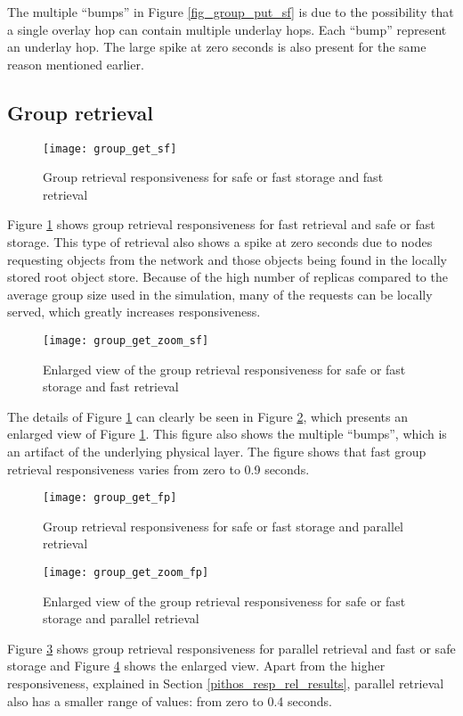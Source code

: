 The multiple ``bumps'' in Figure \ref{fig_group_put_sf} is due to the possibility that a single overlay hop can contain multiple underlay hops. Each ``bump'' represent an underlay hop. The large spike at zero seconds is also present for the same reason mentioned earlier.

\subsection{Group retrieval}

\begin{figure}[htbp]
 \centering
 \texttt{[image: group\_get\_sf]}
 \caption{Group retrieval responsiveness for safe or fast storage and fast retrieval}
 \label{fig_group_get_sf}
\end{figure}
%
Figure \ref{fig_group_get_sf} shows group retrieval responsiveness for fast retrieval and safe or fast storage. This type of retrieval also shows a spike at zero seconds due to nodes requesting objects from the network and those objects being found in the locally stored root object store. Because of the high number of replicas compared to the average group size used in the simulation, many of the requests can be locally served, which greatly increases responsiveness.

\begin{figure}[htbp]
 \centering
 \texttt{[image: group\_get\_zoom\_sf]}
 \caption{Enlarged view of the group retrieval responsiveness for safe or fast storage and fast retrieval}
 \label{fig_group_get_zoom_sf}
\end{figure}
%
The details of Figure \ref{fig_group_get_sf} can clearly be seen in Figure \ref{fig_group_get_zoom_sf}, which presents an enlarged view of Figure \ref{fig_group_get_sf}. This figure also shows the multiple ``bumps'', which is an artifact of the underlying physical layer. The figure shows that fast group retrieval responsiveness varies from zero to 0.9 seconds.

\begin{figure}[htbp]
 \centering
 \texttt{[image: group\_get\_fp]}
 \caption{Group retrieval responsiveness for safe or fast storage and parallel retrieval}
 \label{fig_group_get_fp}
\end{figure}

\begin{figure}[htbp]
 \centering
 \texttt{[image: group\_get\_zoom\_fp]}
 \caption{Enlarged view of the group retrieval responsiveness for safe or fast storage and parallel retrieval}
 \label{fig_group_get_zoom_fp}
\end{figure}
%
Figure \ref{fig_group_get_fp} shows group retrieval responsiveness for parallel retrieval and fast or safe storage and Figure \ref{fig_group_get_zoom_fp} shows the enlarged view. Apart from the higher responsiveness, explained in Section \ref{pithos_resp_rel_results}, parallel retrieval also has a smaller range of values: from zero to 0.4 seconds.

